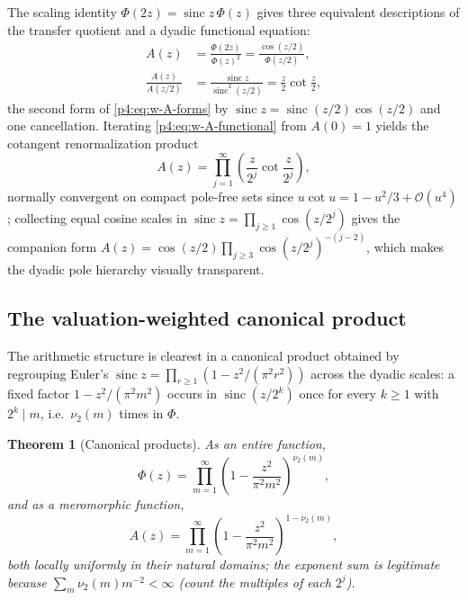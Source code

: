 \documentclass[11pt,oneside]{article}
\numberwithin{equation}{section}
\newtheorem{theorem}{Theorem}[section]
\theoremstyle{definition}
\theoremstyle{remark}
\newcommand{\sinc}{\operatorname{sinc}}
\newcommand{\vtwo}{\nu_2}
\newcommand{\bigO}{\mathcal O}
\begin{document}
The scaling identity $\Phi(2z)=\sinc z\,\Phi(z)$ gives three equivalent
descriptions of the transfer quotient and a dyadic functional equation:
\begin{align}
 A(z)&=\frac{\Phi(2z)}{\Phi(z)^2}
      =\frac{\cos(z/2)}{\Phi(z/2)},
 \label{p4:eq:w-A-forms}\\
 \frac{A(z)}{A(z/2)}
 &=\frac{\sinc z}{\sinc^2(z/2)}
  =\frac z2\cot\frac z2,
 \label{p4:eq:w-A-functional}
\end{align}
the second form of \eqref{p4:eq:w-A-forms} by
$\sinc z=\sinc(z/2)\cos(z/2)$ and one cancellation.  Iterating
\eqref{p4:eq:w-A-functional} from $A(0)=1$ yields the cotangent
renormalization product
\begin{equation}
 A(z)=\prod_{j=1}^{\infty}
 \left(\frac{z}{2^j}\cot\frac{z}{2^j}\right),
 \label{p4:eq:w-cot-product}
\end{equation}
normally convergent on compact pole-free sets since
$u\cot u=1-u^2/3+\bigO(u^4)$; collecting equal cosine scales in
$\sinc z=\prod_{j\ge1}\cos(z/2^j)$ gives the companion form
$A(z)=\cos(z/2)\prod_{j\ge3}\cos(z/2^j)^{-(j-2)}$, which makes the dyadic
pole hierarchy visually transparent.

\subsection{The valuation-weighted canonical product}

The arithmetic structure is clearest in a canonical product obtained by
regrouping Euler's $\sinc z=\prod_{r\ge1}(1-z^2/(\pi^2r^2))$ across the
dyadic scales: a fixed factor $1-z^2/(\pi^2m^2)$ occurs in
$\sinc(z/2^k)$ once for every $k\ge1$ with $2^k\mid m$, i.e.\ $\vtwo(m)$
times in $\Phi$.

\begin{theorem}[Canonical products]
\label{p4:thm:w-canonical}
As an entire function,
\begin{equation}
 \Phi(z)=\prod_{m=1}^{\infty}
 \left(1-\frac{z^2}{\pi^2m^2}\right)^{\vtwo(m)},
 \label{p4:eq:w-phi-canonical}
\end{equation}
and as a meromorphic function,
\begin{equation}
 A(z)=\prod_{m=1}^{\infty}
 \left(1-\frac{z^2}{\pi^2m^2}\right)^{1-\vtwo(m)},
 \label{p4:eq:w-A-canonical}
\end{equation}
both locally uniformly in their natural domains; the exponent sum is
legitimate because
$\sum_m\vtwo(m)m^{-2}<\infty$ (count the multiples of each $2^j$).
\end{theorem}
\end{document}
